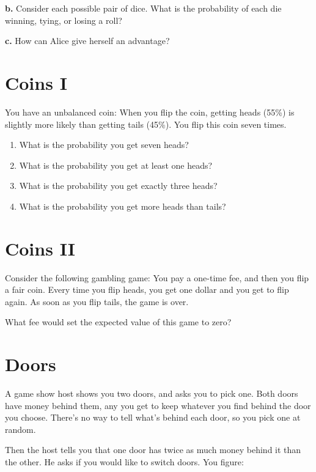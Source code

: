 \documentclass{article}
\begin{document}
\noindent
\textbf{b.}
Consider each possible pair of dice.
What is the probability of each die winning, tying, or losing a roll?
\vspace{1em}

\noindent
\textbf{c.}
How can Alice give herself an advantage?


\section{Coins I}

You have an unbalanced coin:
When you flip the coin, getting heads (55\%) is slightly more likely than getting tails (45\%).
You flip this coin seven times.

\begin{enumerate}[label=\textbf{\alph*.}]
    \item What is the probability you get seven heads?
    \item What is the probability you get at least one heads?
    \item What is the probability you get exactly three heads?
    \item What is the probability you get more heads than tails?
\end{enumerate}

\section{Coins II}

Consider the following gambling game:
You pay a one-time fee, and then you flip a fair coin.
Every time you flip heads, you get one dollar and you get to flip again.
As soon as you flip tails, the game is over.

What fee would set the expected value of this game to zero?


\section{Doors}

A game show host shows you two doors, and asks you to pick one.
Both doors have money behind them, any you get to keep whatever you find behind the door you choose.
There's no way to tell what's behind each door, so you pick one at random.

Then the host tells you that one door has twice as much money behind it than the other.
He asks if you would like to switch doors.
You figure:
\end{document}
